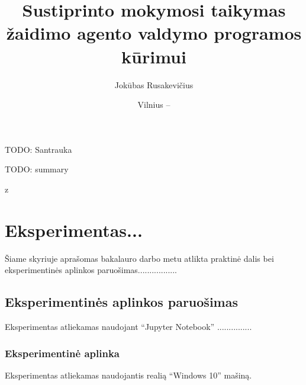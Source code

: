 \documentclass{VUMIFPSbakalaurinis}
\title{Sustiprinto mokymosi taikymas žaidimo agento valdymo programos kūrimui}
\author{Jokūbas Rusakevičius}
\date{Vilnius – \the\year}
\begin{document}
\maketitle

\setcounter{page}{2}

TODO: Santrauka

TODO: summary

\tableofcontents
z

\section{Eksperimentas...}
Šiame skyriuje aprašomas bakalauro darbo metu atlikta praktinė dalis bei eksperimentinės aplinkos paruošimas.................

\subsection{Eksperimentinės aplinkos paruošimas}
Eksperimentas atliekamas naudojant \enquote{Jupyter Notebook}  ...............

\subsubsection{Eksperimentinė aplinka}
Eksperimentas atliekamas naudojantis realią \enquote{Windows 10} mašiną.
\end{document}
